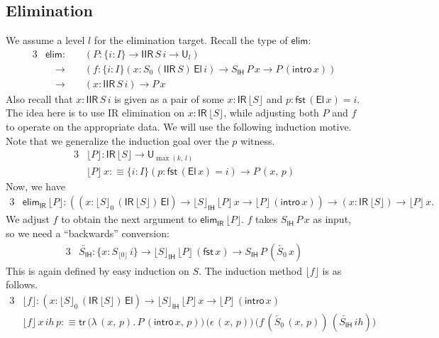 \documentclass[acmsmall,screen,review,anonymous]{acmart}
\newcommand{\msf}[1]{{\mathsf{#1}}}
\newcommand{\U}{\msf{U}}
\newcommand{\El}{\msf{El}}
\newcommand{\IR}{\msf{IR}}
\newcommand{\ih}{{ih}}
\newcommand{\intro}{\msf{intro}}
\newcommand{\IH}{\msf{IH}}
\newcommand{\elim}{\msf{elim}}
\newcommand{\tr}{\msf{tr}}
\newcommand{\fst}{\msf{fst}}
\newcommand{\IIR}{\msf{IIR}}
\newcommand{\Sigr}[1]{\lfloor #1 \rfloor}
\newcommand{\floord}[1]{\lfloor #1 \rfloor}
\newcommand{\ola}[1]{\overleftarrow{#1}}
\begin{document}
\subsection{Elimination}

We assume a level $l$ for the elimination target. Recall the type of $\elim$:
\begin{alignat*}{3}
  &\elim :\,           &&(P : \{i : I\}\to \IIR\,S\,i \to \U_l)\\
  &                \quad\to && (f : \{i : I\}(x : S_0\,(\IIR\,S)\,\El\,i) \to S_\IH\,P\,x \to P\,(\intro\,x))\\
  &                \quad\to && (x : \IIR\,S\,i) \to P\,x
\end{alignat*}
Also recall that $x : \IIR\,S\,i$ is given as a pair of some $x : \IR\,\Sigr{S}$ and $p : \fst\,(\El\,x) = i$.
The idea here is to use IR elimination on $x : \IR\,\floord{S}$, while adjusting both $P$ and $f$ to operate
on the appropriate data. We will use the following induction motive. Note that we generalize the induction goal
over the $p$ witness.
\begin{alignat*}{3}
  &\floord{P} : \IR\,\floord{S} \to \U_{\max(k,\,l)} \\
  &\floord{P}\,x :\equiv \{i : I\}(p : \fst\,(\El\,x) = i) \to P\,(x,\,p)
\end{alignat*}
Now, we have
\begin{alignat*}{3}
  & \elim_\IR\,\floord{P} : ((x : \floord{S}_0\,(\IR\,\floord{S})\,\El) \to \floord{S}_\IH\,\floord{P}\,x \to \floord{P}\,(\intro\,x))
       \to (x : \IR\,\floord{S}) \to \floord{P}\,x.
\end{alignat*}
We adjust $f$ to obtain the next argument to $\elim_\IR\,\floord{P}$. $f$ takes $S_\IH\,P\,x$ as input,
so we need a ``backwards'' conversion:
\begin{alignat*}{3}
  & \ola{S_\IH} : \{x : S_{\floord{0}}\,i\} \to \floord{S}_\IH\,\floord{P}\,(\fst\,x) \to S_\IH\,P\,(\ola{S_0}\,x)
\end{alignat*}
This is again defined by easy induction on $S$. The induction method $\floord{f}$ is as follows.
\begin{alignat*}{3}
  &\floord{f} : (x : \floord{S}_0\,(\IR\,\floord{S})\,\El) \to \floord{S}_\IH\,\floord{P}\,x \to \floord{P}\,(\intro\,x)\\
  &\floord{f}\,x\,\ih\,p :\equiv \tr\,\bigl(\lambda\,(x,\,p).\,P\,(\intro\,x,\,p)\bigr)\,\bigl(\epsilon\,(x,\,p)\bigr)\,
                                      \bigl(f\,(\ola{S_0}\,(x,\,p))\,(\ola{S_\IH}\,\ih)\bigr)
\end{alignat*}
\end{document}
